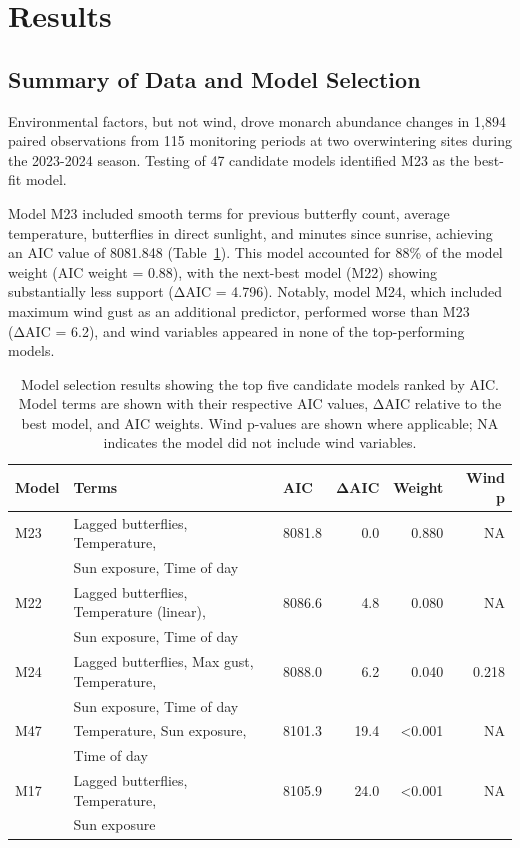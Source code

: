 \section{Results}

\subsection{Summary of Data and Model Selection}

Environmental factors, but not wind, drove monarch abundance changes in 1,894 paired observations from 115 monitoring periods at two overwintering sites during the 2023-2024 season. Testing of 47 candidate models identified M23 as the best-fit model.

Model M23 included smooth terms for previous butterfly count, average temperature, butterflies in direct sunlight, and minutes since sunrise, achieving an AIC value of 8081.848 (Table~\ref{tab:model_selection}). This model accounted for 88\% of the model weight (AIC weight = 0.88), with the next-best model (M22) showing substantially less support (ΔAIC = 4.796). Notably, model M24, which included maximum wind gust as an additional predictor, performed worse than M23 (ΔAIC = 6.2), and wind variables appeared in none of the top-performing models.

\begin{table}[htbp]
\centering
\caption{Model selection results showing the top five candidate models ranked by AIC. Model terms are shown with their respective AIC values, ΔAIC relative to the best model, and AIC weights. Wind p-values are shown where applicable; NA indicates the model did not include wind variables.}
\label{tab:model_selection}
\begin{tabular}{lllrrr}
\hline
Model & Terms & AIC & ΔAIC & Weight & Wind p \\
\hline
M23 & Lagged butterflies, Temperature, & 8081.8 & 0.0 & 0.880 & NA \\
    & Sun exposure, Time of day & & & & \\
M22 & Lagged butterflies, Temperature (linear), & 8086.6 & 4.8 & 0.080 & NA \\
    & Sun exposure, Time of day & & & & \\
M24 & Lagged butterflies, Max gust, Temperature, & 8088.0 & 6.2 & 0.040 & 0.218 \\
    & Sun exposure, Time of day & & & & \\
M47 & Temperature, Sun exposure, & 8101.3 & 19.4 & <0.001 & NA \\
    & Time of day & & & & \\
M17 & Lagged butterflies, Temperature, & 8105.9 & 24.0 & <0.001 & NA \\
    & Sun exposure & & & & \\
\hline
\end{tabular}
\end{table}

